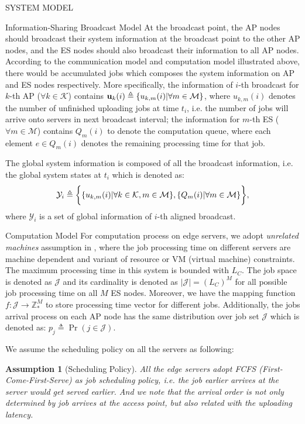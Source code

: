 \documentclass[10pt, conference, letterpaper]{IEEEtran}
\newtheorem{assumption}{Assumption}
\newcommand{\domZ}{\mathbb{Z}_{*}}
\newcommand{\define}{\triangleq}
\renewcommand{\vec}{\mathbf}
\DeclarePairedDelimiter{\set}{\{}{\}}
\DeclarePairedDelimiter{\Brace}{\bigg\{}{\bigg\}}
\newcommand{\apSet}{\mathcal{K}}
\newcommand{\esSet}{\mathcal{M}}
\newcommand{\jSpace}{\mathcal{J}}
\newcommand{\Obsv}{\mathcal{Y}}
\begin{document}
\begin{section}{SYSTEM MODEL}
\begin{subsection}{Information-Sharing Broadcast Model}
            At the broadcast point, the AP nodes should broadcast their system information at the broadcast point to the other AP nodes, and the ES nodes should also broadcast their information to all AP nodes. According to the communication model and computation model illustrated above, there would be accumulated jobs which composes the system information on AP and ES nodes respectively.
            More specifically, the information of $i$-th broadcast for $k$-th AP ($\forall k\in\apSet$) contains $\vec{u}_k(i) \define \set{u_{k,m}(i)|\forall m\in\esSet}$, where $u_{k,m}(i)$ denotes the number of unfinished uploading jobs at time $t_i$, i.e. the number of jobs will arrive onto servers in next broadcast interval; the information for $m$-th ES ($\forall m\in\esSet$) contains $Q_m(i)$ to denote the computation queue, where each element $e \in Q_m(i)$ denotes the remaining processing time for that job.
            
            The global system information is composed of all the broadcast information, i.e. the global system states at $t_i$ which is denoted as:
            \begin{align}
                \Obsv_i \define \Brace{ \set{u_{k,m}(i)|\forall k\in\apSet,m\in\esSet}, \set{Q_m(i)|\forall m\in\esSet} },
            \end{align}
            where $\Obsv_i$ is a set of global information of $i$-th aligned broadcast.
        \end{subsection}

        \begin{subsection}{Computation Model}
            For computation process on edge servers, we adopt \emph{unrelated machines} assumption in \cite{tan-online}, where the job processing time on different servers are machine dependent and variant of resource or VM (virtual machine) constraints.
            The maximum processing time in this system is bounded with $L_C$.
            The job space is denoted as $\jSpace$ and its cardinality is denoted as $|\jSpace|=(L_C)^M$ for all possible job processing time on all $M$ ES nodes.
            Moreover, we have the mapping function $f:\jSpace \to \domZ^M$ to store processing time vector for different jobs.
            Additionally, the jobs arrival process on each AP node has the same distribution over job set $\jSpace$ which is denoted as: $p_j \define \Pr(j\in\jSpace)$.
            
            We assume the scheduling policy on all the servers as following:
            \begin{assumption}[Scheduling Policy]
                All the edge servers adopt \emph{FCFS} (First-Come-First-Serve) as job scheduling policy, i.e. the job earlier arrives at the server would get served earlier. And we note that the arrival order is not only determined by job arrives at the access point, but also related with the uploading latency.
            \end{assumption}
        \end{subsection}
    \end{section}
\end{document}
